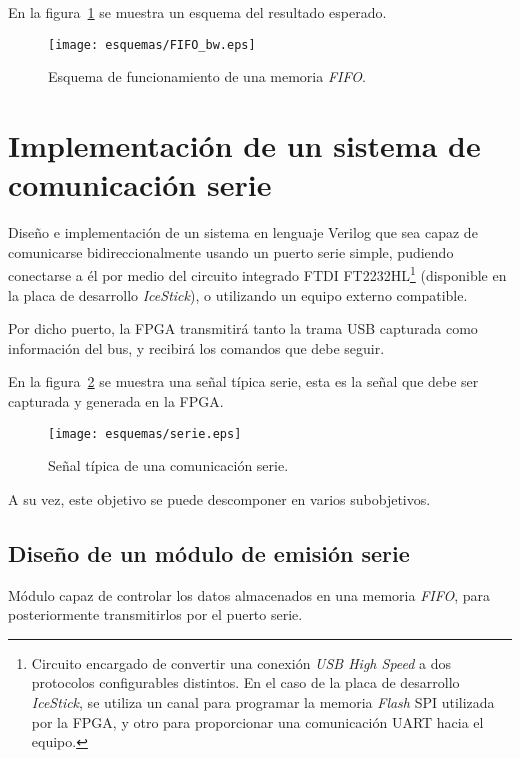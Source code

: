 En la figura~\ref{fig:FIFO_info} se muestra un esquema del resultado esperado.

\begin{figure}[htb]
    \centering
    \texttt{[image: esquemas/FIFO\_bw.eps]}
    \caption{Esquema de funcionamiento de una memoria \emph{FIFO}.}
    \label{fig:FIFO_info}
\end{figure}



\section{Implementación de un sistema de comunicación serie}
Diseño e implementación de un sistema en lenguaje Verilog que sea capaz de comunicarse bidireccionalmente usando un puerto serie simple\cite{design-uart-vhdl}, pudiendo conectarse a él por medio del circuito integrado FTDI FT2232HL\footnote{Circuito encargado de convertir una conexión \emph{USB High Speed} a dos protocolos configurables distintos. En el caso de la placa de desarrollo \emph{IceStick}, se utiliza un canal para programar la memoria \emph{Flash} SPI utilizada por la FPGA, y otro para proporcionar una comunicación UART hacia el equipo.} (disponible en la placa de desarrollo \emph{IceStick}\cite{icestickmanual}), o utilizando un equipo externo compatible.

Por dicho puerto, la FPGA transmitirá tanto la trama USB capturada como información del bus, y recibirá los comandos que debe seguir.

En la figura~\ref{fig:serie_esquema} se muestra una señal típica serie, esta es la señal que debe ser capturada y generada en la FPGA.

\begin{figure}[htb]
    \centering
    \texttt{[image: esquemas/serie.eps]}
    \caption{Señal típica de una comunicación serie.}
    \label{fig:serie_esquema}
\end{figure}

A su vez, este objetivo se puede descomponer en varios subobjetivos.

\subsection{Diseño de un módulo de emisión serie}
Módulo capaz de controlar los datos almacenados en una memoria \emph{FIFO}, para posteriormente transmitirlos por el puerto serie.

